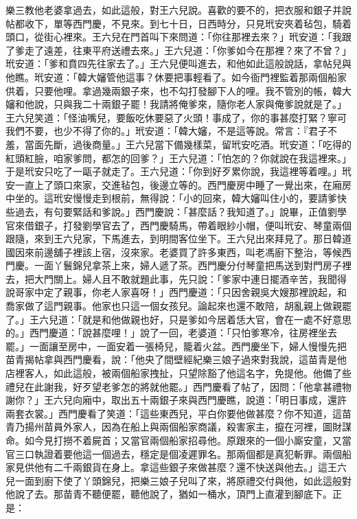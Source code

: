\begin{showcontents}{}
樂三教他老婆拿過去，如此這般，對王六兒說。喜歡的要不的，把衣服和銀子并說帖都收下，單等西門慶，不見來。到七十日，日西時分，只見玳安夾着毡包，騎着頭口，從街心裡來。王六兒在門首叫下來問道：「你往那裡去來？」玳安道：「我跟了爹走了遠差，往東平府送禮去來。」王六兒道：「你爹如今在那裡？來了不曾？」玳安道：「爹和賁四先往家去了。」王六兒便叫進去，和他如此這般說話，拿帖兒與他瞧。玳安道：「韓大嬸管他這事？休要把事輕看了。如今衙門裡監着那兩個船家供着，只要他哩。拿過幾兩銀子來，也不勾打發腳下人的哩。我不管別的帳，韓大嬸和他說，只與我二十兩銀子罷！我請將俺爹來，隨你老人家與俺爹說就是了。」王六兒笑道：「怪油嘴兒，要飯吃休要惡了火頭！事成了，你的事甚麼打緊？寧可我們不要，也少不得了你的。」玳安道：「韓大嬸，不是這等說。常言：『君子不羞，當面先斷，過後商量。」王六兒當下備幾樣菜，留玳安吃酒。玳安道：「吃得的紅頭紅臉，咱家爹問，都怎的回爹？」王六兒道：「怕怎的？你就說在我這裡來。」于是玳安只吃了一甌子就走了。王六兒道：「你到好歹累你說，我這裡等着哩。」玳安一直上了頭口來家，交進毡包，後邊立等的。西門慶房中睡了一覺出來，在廂房中坐的。這玳安慢慢走到根前，無得說：「小的回來，韓大嬸叫住小的，要請爹快些過去，有句要緊話和爹說。」西門慶說：「甚麼話？我知道了。」說畢，正值劉學官來借銀子，打發劉學官去了，西門慶騎馬，帶着眼紗小帽，便叫玳安、琴童兩個跟隨，來到王六兒家，下馬進去，到明間客位坐下。王六兒出來拜見了。那日韓道國因來前邊舖子裡該上宿，沒來家。老婆買了許多東西，叫老馮廚下整治，等候西門慶。一面丫鬟錦兒拿茶上來，婦人遞了茶。西門慶分付琴童把馬送到對門房子裡去，把大門關上。婦人且不敢就題此事，先只說：「爹家中連日擺酒辛苦，我聞得說哥家中定了親事，你老人家喜呀！」西門慶道：「只因舍親吳大嫂那裡說起，和喬家做了這門親事。他家也只這一個女孩兒。論起來也還不敢陪，胡亂親上做親罷了。」王六兒道：「就是和他做親也好，只是爹如今居着恁大官，會在一處不好意思的。」西門慶道：「說甚麼哩！」說了一回，老婆道：「只怕爹寒冷，往房裡坐去罷。」一面讓至房中，一面安着一張椅兒，籠着火盆。西門慶坐下，婦人慢慢先把苗青揭帖拿與西門慶看，說：「他央了間壁經紀樂三娘子過來對我說，這苗青是他店裡客人，如此這般，被兩個船家拽扯，只望除豁了他這名字，免提他。他備了些禮兒在此謝我，好歹望老爹怎的將就他罷。」西門慶看了帖了，因問：「他拿甚禮物謝你？」王六兒向廂中，取出五十兩銀子來與西門慶瞧，說道：「明日事成，還許兩套衣裳。」西門慶看了笑道：「這些東西兒，平白你要他做甚麼？你不知道，這苗青乃揚州苗員外家人，因為在船上與兩個船家商議，殺害家主，攛在河裡，圖財謀命。如今見打撈不着屍首；又當官兩個船家招尋他。原跟來的一個小廝安童，又當官三口執證着要他這一個過去，穩定是個凌遲罪名。那兩個都是真犯斬罪。兩個船家見供他有二千兩銀貨在身上。拿這些銀子來做甚麼？還不快送與他去。」這王六兒一面到廚下使了丫頭錦兒，把樂三娘子兒叫了來，將原禮交付與他，如此這般對他說了去。那苗青不聽便罷，聽他說了，猶如一桶水，頂門上直灌到腳底下。正是：


\end{showcontents}
